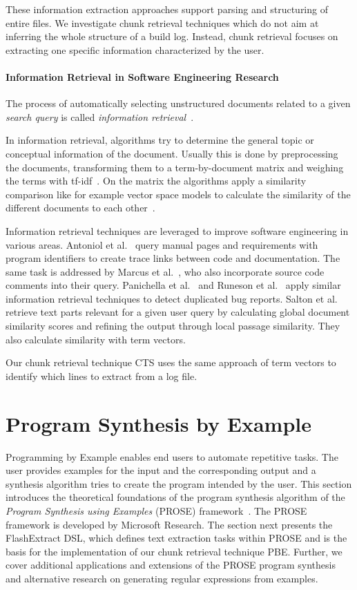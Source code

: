 \documentclass[\myrootdir/main.tex]{subfiles}
\begin{document}
These information extraction approaches support parsing and structuring of entire files.
We investigate chunk retrieval techniques which do not aim at inferring the whole structure of a build log.
Instead, chunk retrieval focuses on extracting one specific information characterized by the user.

\paragraph{Information Retrieval in Software Engineering Research}
The process of automatically selecting unstructured documents related to a given \emph{search query} is called \emph{information retrieval}~\cite{schutze2008introduction}.

In information retrieval, algorithms try to determine the general topic or conceptual information of the document.
Usually this is done by preprocessing the documents, transforming them to a term-by-document matrix and weighing the terms with tf-idf~\cite{lee1997document}.
On the matrix the algorithms apply a similarity comparison like for example vector space models to calculate the similarity of the different documents to each other~\cite{panichella2016parameterizing}.

Information retrieval techniques are leveraged to improve software engineering in various areas.
Antoniol et al.~\cite{antoniol2002recovering} query manual pages and requirements with program identifiers to create trace links between code and documentation.
The same task is addressed by Marcus et al.~\cite{marcus2005recovery}, who also incorporate source code comments into their query.
Panichella et al.~\cite{panichella2016parameterizing} and Runeson et al.~\cite{runeson2007detection} apply similar information retrieval techniques to detect duplicated bug reports.
Salton et al.~\cite{salton1993approaches} retrieve text parts relevant for a given user query by calculating global document similarity scores and refining the output through local passage similarity.
They also calculate similarity with term vectors.

Our chunk retrieval technique CTS uses the same approach of term vectors to identify which lines to extract from a log file.

\section{Program Synthesis by Example}
\label{sec:rw-prose}
Programming by Example enables end users to automate repetitive tasks.
The user provides examples for the input and the corresponding output and a synthesis algorithm tries to create the program intended by the user.
This section introduces the theoretical foundations of the program synthesis algorithm of the \emph{Program Synthesis using Examples} (PROSE) framework~\cite{prose2019webpage}.
The PROSE framework is developed by Microsoft Research.
The section next presents the FlashExtract DSL, which defines text extraction tasks within PROSE and is the basis for the implementation of our chunk retrieval technique PBE\@.
Further, we cover additional applications and extensions of the PROSE program synthesis and alternative research on generating regular expressions from examples.
\end{document}
